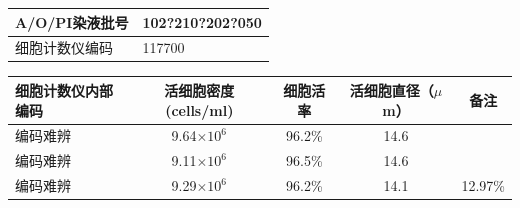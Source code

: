 \documentclass[UTF8,10pt,a4paper,fontset=fandol]{ctexart}
\newcommand{\fieldvalue}[1]{#1}
\newcommand{\handwritten}[1]{#1}
\begin{document}
\begin{tabularx}{\textwidth}{|p{}|X|}
\hline
A/O/PI染液批号 &
\fieldvalue{\handwritten{102?210?202?050}}
\\ \hline
细胞计数仪编码 &
\fieldvalue{\handwritten{117700}}
\\ \hline
\end{tabularx}

\small
\begin{tabularx}{\textwidth}{|X|c|c|c|c|}
\hline
细胞计数仪内部编码 & 活细胞密度 (cells/ml) & 细胞活率 & 活细胞直径（$\mu$m） & 备注 \\
\hline
\fieldvalue{\handwritten{编码难辨}} &
\fieldvalue{\handwritten{9.64}}\(\times10^6\) &
\fieldvalue{\handwritten{96.2}}\% &
\fieldvalue{\handwritten{14.6}} &
\\ \hline
\fieldvalue{\handwritten{编码难辨}} &
\fieldvalue{\handwritten{9.11}}\(\times10^6\) &
\fieldvalue{\handwritten{96.5}}\% &
\fieldvalue{\handwritten{14.6}} &
\\ \hline
\fieldvalue{\handwritten{编码难辨}} &
\fieldvalue{\handwritten{9.29}}\(\times10^6\) &
\fieldvalue{\handwritten{96.2}}\% &
\fieldvalue{\handwritten{14.1}} &
\fieldvalue{\handwritten{12.97\%}}

\end{tabularx}
\end{document}
